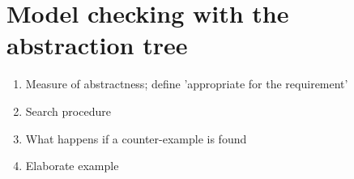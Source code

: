 \section{Model checking with the abstraction tree}
\label{modelCheckingwAbstTree}


	\begin{enumerate}
		\item Measure of abstractness; define 'appropriate for the requirement'
		\item Search procedure
		\item What happens if a counter-example is found
		\item Elaborate example
		\end{enumerate}